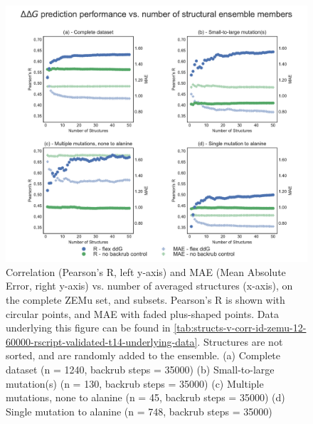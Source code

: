 \begin{figure}
  \includegraphics[width=\textwidth,keepaspectratio]{structs-v-corr-id-zemu-12-60000-rscript-validated-t14.pdf}
  \caption[]{ %
    Correlation (Pearson's R, left y-axis) and MAE (Mean Absolute Error, right y-axis) vs. number of averaged structures (x-axis), on the complete ZEMu set, and subsets.
    Pearson's R is shown with circular points, and MAE with faded plus-shaped points.
    Data underlying this figure can be found in \cref{tab:structs-v-corr-id-zemu-12-60000-rscript-validated-t14-underlying-data}.
    Structures are not sorted, and are randomly added to the ensemble. 
    (a) Complete dataset (n = 1240, backrub steps = 35000)
    (b) Small-to-large mutation(s) (n = 130, backrub steps = 35000)
    (c) Multiple mutations, none to alanine (n = 45, backrub steps = 35000)
    (d) Single mutation to alanine (n = 748, backrub steps = 35000)
  } \label{fig:structs-v-corr-id-zemu-12-60000-rscript-validated-t14}
\end{figure}
